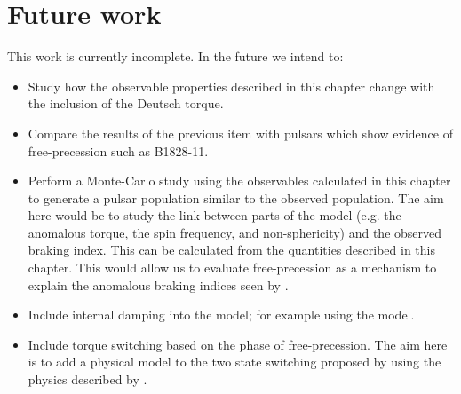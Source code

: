 \documentclass[/home/greg/Thesis/main/main.tex]{subfiles}
\begin{document}
\section{Future work}
This work is currently incomplete. In the future we intend to:
\begin{itemize}
    \item Study how the observable properties described in this chapter change
      with the inclusion of the Deutsch torque.
      
   \item Compare the results of the previous item with pulsars which show evidence
   of free-precession such as B1828-11.

   \item Perform a Monte-Carlo study using the observables calculated in this chapter
   to generate a pulsar population similar to the observed population. The aim here
   would be to study the link between parts of the model (e.g. the anomalous torque, 
   the spin frequency, and non-sphericity) and the observed braking index. This can
   be calculated from the quantities described in this chapter. This would allow us
   to evaluate free-precession as a mechanism to explain the anomalous braking indices
   seen by \citet{Biryukov2012}.

   \item Include internal damping into the model; for example using the \citet{Bondi1955}
   model.

   \item Include torque switching based on the phase of free-precession. The aim here
   is to add a physical model to the two state switching proposed by \citet{Lyne2010}
   using the physics described by \citet{Jones2012}. 
\end{itemize}
\end{document}
